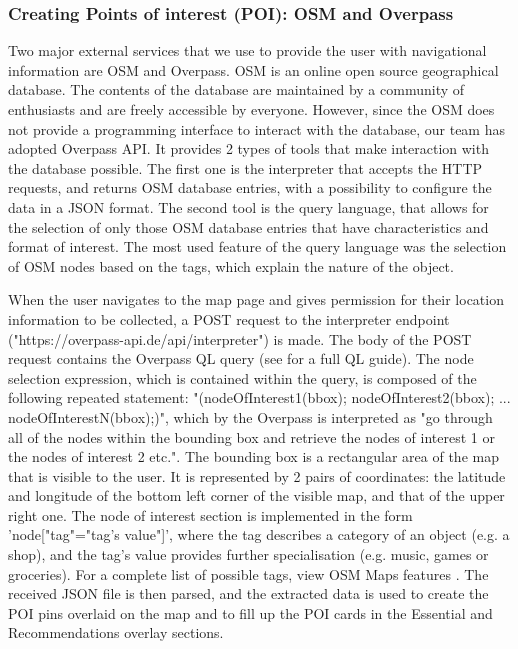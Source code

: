 \subsubsection{Creating Points of interest (POI): OSM and Overpass}

Two major external services that we use to provide the user with navigational information are OSM and Overpass. OSM is an online open source geographical database. The contents of the database are maintained by a community of enthusiasts and are freely accessible by everyone. However, since the OSM does not provide a programming interface to interact with the database, our team has adopted Overpass API. It provides 2 types of tools that make interaction with the database possible. The first one is the interpreter that accepts the HTTP requests, and returns OSM database entries, with a possibility to configure the data in a JSON format. The second tool is the query language, that allows for the selection of only those OSM database entries that have characteristics and format of interest. The most used feature of the query language was the selection of OSM nodes based on the tags, which explain the nature of the object. 

When the user navigates to the map page and gives permission for their location information to be collected, a POST request to the interpreter endpoint ("https://overpass-api.de/api/interpreter") \cite{OverpassAPIDocsWiki} is made. The body of the POST request contains the Overpass QL query (see \cite{OverpassAPIQueryLanguageGuide} for a full QL guide). The node selection expression, which is contained within the query, is composed of the following repeated statement: "(nodeOfInterest1(bbox); nodeOfInterest2(bbox); ... nodeOfInterestN(bbox);)", which by the Overpass is interpreted as "go through all of the nodes within the bounding box and retrieve the nodes of interest 1 or the nodes of interest 2 etc.". The bounding box is a rectangular area of the map that is visible to the user. It is represented by 2 pairs of coordinates: the latitude and longitude of the bottom left corner of the visible map, and that of the upper right one. The node of interest section is implemented in the form 'node["tag"="tag's value"]', where the tag describes a category of an object (e.g. a shop), and the tag's value provides further specialisation (e.g. music, games or groceries). For a complete list of possible tags, view OSM Maps features \cite{OSM_map_features}. The received JSON file is then parsed, and the extracted data is used to create the POI pins overlaid on the map and to fill up the POI cards in the Essential and Recommendations overlay sections.


